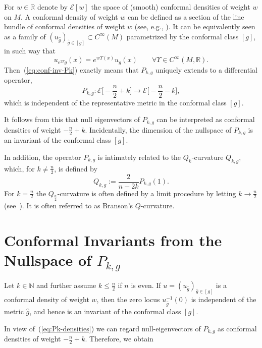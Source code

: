 \documentclass{amsart}
\theoremstyle{definition}
\theoremstyle{remark}
\begin{document}
For $w\in {{\mathbb{R}}}$ denote by ${{\mathcal{E}}}[w]$ the space of (smooth) conformal
densities of weight $w$ on $M$. A conformal density of weight $w$ can
be defined as a section of the line bundle of conformal densities of
weight $w$ (see, e.g., \cite{PR}). It can be equivalently seen as a
family of $(u_{\hat{g}})_{\hat{g}\in [g]}\subset C^{\infty}(M)$
parametrized by the conformal class $[g]$, in such way that
\begin{equation*}
    u_{e^{2\Upsilon} g}(x)=e^{w\Upsilon(x)}u_{g}(x) \qquad \forall \Upsilon\in C^{\infty}(M,{{\mathbb{R}}}).
\end{equation*}Then~(\ref{eq:conf-inv-Pk}) exactly means that $P_{k,g}$ uniquely extends to a differential operator,
\begin{equation}
 P_{k,g}:{{\mathcal{E}}}\biggl[-\frac{n}2+k\biggr]\longrightarrow {{\mathcal{E}}}\biggl[-\frac{n}2-k\biggr],  \label{eq:Pk-densities}
\end{equation}which is independent of the representative metric in the conformal class $[g]$. 

It follows from this that null eigenvectors of $P_{k,g}$ can be
interpreted as conformal densities of weight
$-\frac{n}{2}+k$. Incidentally, the dimension of the nullspace of
$P_{k,g}$ is an invariant of the conformal class $[g]$.

In addition, the operator $P_{k,g}$ is intimately related to the $Q_{k}$-curvature $Q_{k,g}$, which, for $k\neq \frac{n}{2}$, is defined 
by 
\begin{equation*}
    Q_{k,g}:=\frac{2}{n-2k}P_{k,g}(1).
\end{equation*}
For $k=\frac{n}{2}$ the $Q_{\frac{n}{2}}$-curvature is often defined
by a limit procedure by letting $k\rightarrow \frac{n}{2}$
(see~\cite{BO,GZ}). It is often referred to as Branson's
$Q$-curvature.

\section{Conformal Invariants from the Nullspace of $P_{k,g}$}\label{section:nodal-sets}

Let $k\in {\mathbb{N}}$ and further assume $k\leq
\frac{n}{2}$ if $n$ is even. If $u=(u_{\hat{g}})_{\hat{g}\in [g]}$ is
a conformal density of weight $w$, then the zero locus
$u^{-1}_{\hat{g}}(0)$ is independent of the metric $\hat{g}$, and
hence is an invariant of the conformal class $[g]$.

In view of~(\ref{eq:Pk-densities}) we 
can regard null-eigenvectors of $P_{k,g}$ as conformal densities of weight $-\frac{n}{2}+k$. Therefore, we obtain
\end{document}
